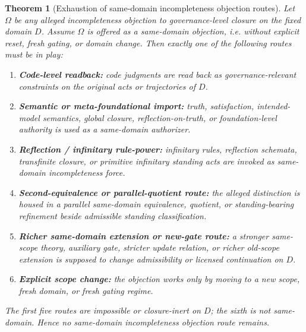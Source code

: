 \documentclass[11pt]{article}
\theoremstyle{plain}
\newtheorem{theorem}{Theorem}[section]
\theoremstyle{definition}
\newcommand{\domain}{D}
\begin{document}
\begin{theorem}[Exhaustion of same-domain incompleteness objection routes]
\label{thm:incompleteness-routes}
Let $\Omega$ be any alleged incompleteness objection to governance-level closure on the fixed domain $\domain$. Assume $\Omega$ is offered as a \emph{same-domain} objection, i.e. without explicit reset, fresh gating, or domain change. Then exactly one of the following routes must be in play:
\begin{enumerate}[label=(\roman*), leftmargin=2.5em]
    \item \textbf{Code-level readback:} code judgments are read back as governance-relevant constraints on the original acts or trajectories of $\domain$.
    \item \textbf{Semantic or meta-foundational import:} truth, satisfaction, intended-model semantics, global closure, reflection-on-truth, or foundation-level authority is used as a same-domain authorizer.
    \item \textbf{Reflection / infinitary rule-power:} infinitary rules, reflection schemata, transfinite closure, or primitive infinitary standing acts are invoked as same-domain incompleteness force.
    \item \textbf{Second-equivalence or parallel-quotient route:} the alleged distinction is housed in a parallel same-domain equivalence, quotient, or standing-bearing refinement beside admissible standing classification.
    \item \textbf{Richer same-domain extension or new-gate route:} a stronger same-scope theory, auxiliary gate, stricter update relation, or richer old-scope extension is supposed to change admissibility or licensed continuation on $\domain$.
    \item \textbf{Explicit scope change:} the objection works only by moving to a new scope, fresh domain, or fresh gating regime.
\end{enumerate}
The first five routes are impossible or closure-inert on $\domain$; the sixth is not same-domain. Hence no same-domain incompleteness objection route remains.
\end{theorem}
\end{document}
